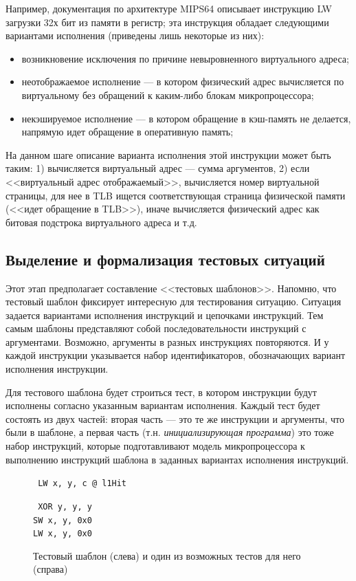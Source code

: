 Например, документация по архитектуре MIPS64 описывает инструкцию LW загрузки 32х бит из памяти в регистр; эта инструкция обладает следующими вариантами исполнения (приведены лишь некоторые из них):
\begin{itemize}
    \item возникновение исключения по причине невыровненного виртуального адреса;
    \item неотображаемое исполнение --- в котором физический адрес вычисляется по виртуальному без обращений к каким-либо блокам микропроцессора;
    \item некэшируемое исполнение --- в котором обращение в кэш-память не делается, напрямую идет обращение в оперативную память;
\end{itemize}

На данном шаге описание варианта исполнения этой инструкции может быть таким: 1) вычисляется виртуальный адрес --- сумма аргументов, 2) если <<виртуальный адрес отображаемый>>, вычисляется номер виртуальной страницы, для нее в TLB ищется соответствующая страница физической памяти (<<идет обращение в TLB>>), иначе вычисляется физический адрес как битовая подстрока виртуального адреса и т.д.

\subsection{Выделение и формализация тестовых ситуаций}\label{sec:template_stage}

Этот этап предполагает составление <<тестовых шаблонов>>. Напомню, что тестовый шаблон фиксирует интересную для тестирования ситуацию. Ситуация задается вариантами исполнения инструкций и цепочками инструкций. Тем самым шаблоны представляют собой последовательности инструкций с аргументами. Возможно, аргументы в разных инструкциях повторяются.
И у каждой инструкции указывается набор идентификаторов, обозначающих вариант исполнения инструкции.

Для тестового шаблона будет строиться тест, в котором инструкции будут исполнены согласно указанным вариантам исполнения. Каждый тест будет состоять из двух частей: вторая часть --- это те же инструкции и аргументы, что были в шаблоне, а первая часть (т.н. \emph{инициализирующая программа}) это тоже набор инструкций, которые подготавливают модель микропроцессора к выполнению инструкций шаблона в заданных вариантах исполнения инструкций.

\begin{figure}[h]
\quad\parbox{0.5\textwidth}{ \tt
LW x, y, c @ l1Hit } \parbox{0.3\textwidth}{ \tt
XOR y, y, y\\
SW x, y, 0x0\\
LW x, y, 0x0\\}
\caption{Тестовый шаблон (слева) и один из возможных тестов для него
(справа)}\label{test_template_exmp1}
\end{figure}

